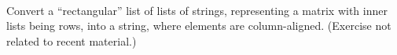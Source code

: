 \documentclass{article}
\begin{document}
\begin{exercise}
\begin{itemize}
    {\hlstd{\# }}{}{}{\hlopt{,
    }}{}{\hlopt{= }}{}{\hlopt{(}}{}{\hlopt{() -> }}{}{}{}{\hlopt{);;}}{\hlendline{}}\\
    {}{}{\hlopt{: }}{}{\hlopt{=
    }}{}{\hlendline{}}\\
    {}{}{\hlopt{: }}{}{}{\hlopt{=}}{\hlendline{}}\\
    {\hlstd{ \ }}{\hlopt{[}}{}{\hlopt{;
    }}{}{}{\hlendline{}}
  \end{itemize}
\end{exercise}

\begin{exercise}
  Convert a ``rectangular'' list of lists of strings, representing a matrix
  with inner lists being rows, into a string, where elements are
  column-aligned. (Exercise not related to recent material.)
\end{exercise}
\end{document}
